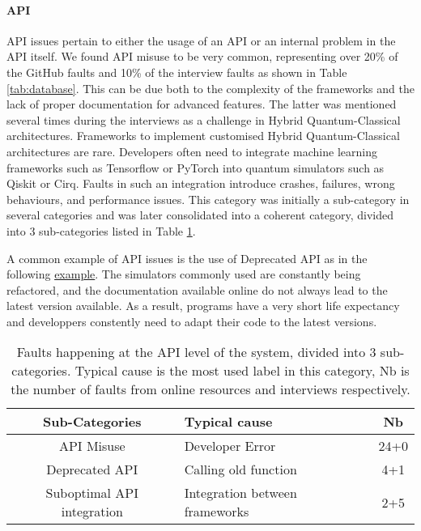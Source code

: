 \paragraph{API}
API issues pertain to either the usage of an API or an internal problem in the API itself. We found API misuse to be very common, representing over 20\% of the GitHub faults and 10\% of the interview faults as shown in Table \ref{tab:database}. This can be due both to the complexity of the frameworks and the lack of proper documentation for advanced features. The latter was mentioned several times during the interviews as a challenge in Hybrid Quantum-Classical architectures. Frameworks to implement customised Hybrid Quantum-Classical architectures are rare. Developers often need to integrate machine learning frameworks such as Tensorflow or PyTorch into quantum simulators such as Qiskit or Cirq. Faults in such an integration introduce crashes, failures, wrong behaviours, and performance issues. This category was initially a sub-category in several categories and was later consolidated into a coherent category, divided into 3 sub-categories listed in Table \ref{tab:api}. 

A common example of API issues is the use of Deprecated API as in the following \href{https://github.com/Qiskit/qiskit-aer/issues/1595}{example}. The simulators commonly used are constantly being refactored, and the documentation available online do not always lead to the latest version available. As a result, programs have a very short life expectancy and developpers constently need to adapt their code to the latest versions.

\begin{table}[hbt!]
    \centering
        \caption{Faults happening at the API level of the system, divided into 3 sub-categories. Typical cause is the most used label in this category, Nb is the number of faults from online resources and interviews respectively.}
    \label{tab:api}
    \begin{tabular}{@{}c|l|c}

         \textbf{Sub-Categories} & \textbf{Typical cause} & \textbf{Nb} \\
         \hline
      API Misuse & Developer Error & 24+0\\
      \hline
      Deprecated API & Calling old function & 4+1 \\
      \hline
        Suboptimal API integration  & Integration between frameworks & 2+5 \\
    \end{tabular}
\end{table}


